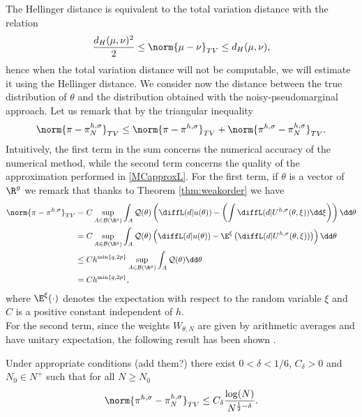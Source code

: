 The Hellinger distance is equivalent to the total variation distance with the relation \cite{GiS02}
\begin{equation}\label{eq:TVvsHell}
	\frac{d_H(\mu, \nu)^2}{2} \leq \norm{\mu-\nu}_{TV} \leq d_H(\mu, \nu),
\end{equation}
hence when the total variation distance will not be computable, we will estimate it using the Hellinger distance. We consider now the distance between the true distribution of $\theta$ and the distribution obtained with the noisy-pseudomarginal approach. Let us remark that by the triangular inequality
\begin{equation}
	\norm{\pi- \pi_N^{h, \sigma}}_{TV} \leq \norm{\pi - \pi^{h, \sigma}}_{TV} + \norm{\pi^{h,\sigma} - \pi_N^{h, \sigma}}_{TV}.
\end{equation}
\noindent Intuitively, the first term in the sum concerns the numerical accuracy of the numerical method, while the second term concerns the quality of the approximation performed in \eqref{MCapproxL}. For the first term, if $\theta$ is a vector of $\R^g$ we remark that thanks to Theorem \ref{thm:weakorder} we have
\begin{equation}
\begin{aligned}
	\norm{\pi-\pi^{h,\sigma}}_{TV} &= C \sup_{A\in\mathcal{B}(\R^g)} \int_{A} \mathcal{Q}(\theta)\left(\diffL(d|u(\theta)) - \left(\int \diffL(d|U^{h,\sigma}(\theta,\xi))\dd\xi\right) \right) \dd \theta\\
							  &= C \sup_{A\in\mathcal{B}(\R^g)} \int_{A} \mathcal{Q}(\theta)\left(\diffL(d|u(\theta)) - \E^\xi\left(\diffL(d|U^{h,\sigma}(\theta,\xi))\right) \right) \dd \theta\\
							  &\leq C h^{\min\left\{q,2p\right\}}\sup_{A\in\mathcal{B}(\R^g)}\int_{A} \mathcal{Q}(\theta) \dd\theta \\
						      &= C h^{\min\left\{q,2p\right\}},
\end{aligned}
\end{equation}
where $\E^\xi(\cdot)$ denotes the expectation with respect to the random variable $\xi$ and $C$ is a positive constant independent of $h$. \\
For the second term, since the weights $W_{\theta,N}$ are given by arithmetic averages and have unitary expectation, the following result has been shown \cite{MLR16}.
\begin{theorem} Under appropriate conditions (add them?) there exist $0 < \delta < 1/6$, $C_{\delta} > 0$ and $N_0 \in N^{+}$ such that for all $N \geq N_0$ 
\begin{equation}
	\norm{\pi^{h,\sigma} - \pi^{h,\sigma}_N}_{TV} \leq C_{\delta} \frac{\log(N)}{N^{\frac{1}{2} - \delta}}.
\end{equation}
\end{theorem}
